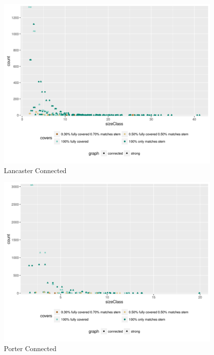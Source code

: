\documentclass[11pt]{article}
\begin{document}
\begin{figure}[H]
\centering
\includegraphics[scale=0.8]{Lancasterconnected.png}
\caption{Lancaster Connected}
\label{fig:lanc}
\end{figure}
\begin{figure}[H]
\centering
\includegraphics[scale=0.8]{PorterStemmerconnected.png}
\caption{Porter Connected}
\label{fig:portc}
\end{figure}
\end{document}
